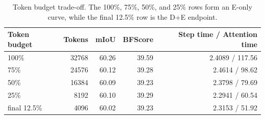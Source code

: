 \begin{table}[t]
  \centering
  \caption{Token budget trade-off. The 100\%, 75\%, 50\%, and 25\% rows form an E-only curve, while the final 12.5\% row is the D+E endpoint.}
  \label{tab:token_budget_tradeoff}
  \begin{tabular}{lrrrr}
    \toprule
    Token budget & Tokens & mIoU & BFScore & Step time / Attention time \\
    \midrule
    100\% & 32768 & 60.26 & 39.59 & 2.4089 / 117.56 \\
    75\% & 24576 & 60.12 & 39.28 & 2.4614 / 98.62 \\
    50\% & 16384 & 60.09 & 39.23 & 2.3798 / 79.69 \\
    25\% & 8192 & 60.10 & 39.29 & 2.2941 / 60.54 \\
    final 12.5\% & 4096 & 60.02 & 39.23 & 2.3153 / 51.92 \\
    \bottomrule
  \end{tabular}
\end{table}
